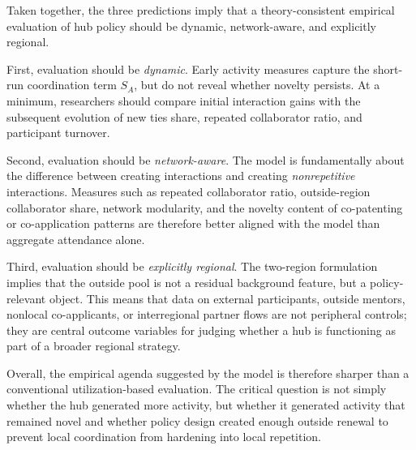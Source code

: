 Taken together, the three predictions imply that a theory-consistent empirical evaluation of hub policy should be dynamic, network-aware, and explicitly regional.

First, evaluation should be \emph{dynamic}. Early activity measures capture the short-run coordination term $S_A$, but do not reveal whether novelty persists. At a minimum, researchers should compare initial interaction gains with the subsequent evolution of new ties share, repeated collaborator ratio, and participant turnover.

Second, evaluation should be \emph{network-aware}. The model is fundamentally about the difference between creating interactions and creating \emph{nonrepetitive} interactions. Measures such as repeated collaborator ratio, outside-region collaborator share, network modularity, and the novelty content of co-patenting or co-application patterns are therefore better aligned with the model than aggregate attendance alone.

Third, evaluation should be \emph{explicitly regional}. The two-region formulation implies that the outside pool is not a residual background feature, but a policy-relevant object. This means that data on external participants, outside mentors, nonlocal co-applicants, or interregional partner flows are not peripheral controls; they are central outcome variables for judging whether a hub is functioning as part of a broader regional strategy.

Overall, the empirical agenda suggested by the model is therefore sharper than a conventional utilization-based evaluation. The critical question is not simply whether the hub generated more activity, but whether it generated activity that remained novel and whether policy design created enough outside renewal to prevent local coordination from hardening into local repetition.
